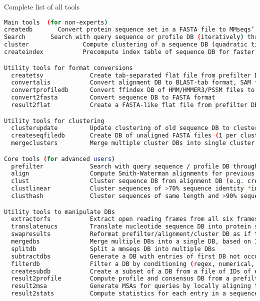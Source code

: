 \documentclass[11pt,a4paper]{scrreprt}
\begin{document}
Complete list of all tools
\begin{lstlisting}[language=bash, basicstyle=\footnotesize]
Main tools  (for non-experts)
createdb       Convert protein sequence set in a FASTA file to MMseqs’ sequence DB format
Search       Search with query sequence or profile DB (iteratively) through target sequence DB
cluster               Compute clustering of a sequence DB (quadratic time)
createindex           Precompute index table of sequence DB for faster searches

Utility tools for format conversions
  createtsv             Create tab-separated flat file from prefilter DB, alignment DB, or cluster DB
  convertalis           Convert alignment DB to BLAST-tab format, SAM flat file, or to raw pairwise alignments
  convertprofiledb      Convert ffindex DB of HMM/HMMER3/PSSM files to MMseqs profile DB
  convert2fasta         Convert sequence DB to FASTA format
  result2flat           Create a FASTA-like flat file from prefilter DB, alignment DB, or cluster DB

Utility tools for clustering
  clusterupdate         Update clustering of old sequence DB to clustering of new sequence DB
  createseqfiledb       Create DB of unaligned FASTA files (1 per cluster) from sequence DB and cluster DB
  mergeclusters         Merge multiple cluster DBs into single cluster DB

Core tools (for advanced users)
  prefilter             Search with query sequence / profile DB through target DB (k-mer matching + ungapped alignment)
  align                 Compute Smith-Waterman alignments for previous results (e.g. prefilter DB, cluster DB)
  clust                 Cluster sequence DB from alignment DB (e.g. created by searching DB against itself)
  clustlinear           Cluster sequences of >70% sequence identity *in linear time*
  clusthash             Cluster sequences of same length and >90% sequence identity *in linear time*

Utility tools to manipulate DBs
  extractorfs           Extract open reading frames from all six frames from nucleotide sequence DB
  translatenucs         Translate nucleotide sequence DB into protein sequence DB
  swapresults           Reformat prefilter/alignment/cluster DB as if target DB had been searched through query DB
  mergedbs              Merge multiple DBs into a single DB, based on IDs (names) of entries
  splitdb               Split a mmseqs DB into multiple DBs
  subtractdbs           Generate a DB with entries of first DB not occurring in second DB
  filterdb              Filter a DB by conditioning (regex, numerical, ...) on one of its whitespace-separated columns
  createsubdb           Create a subset of a DB from a file of IDs of entries
  result2profile        Compute profile and consensus DB from a prefilter, alignment or cluster DB
  result2msa            Generate MSAs for queries by locally aligning their matched targets in prefilter/alignment/cluster DB
  result2stats          Compute statistics for each entry in a sequence, prefilter, alignment or cluster DB


\end{lstlisting}
\end{document}
